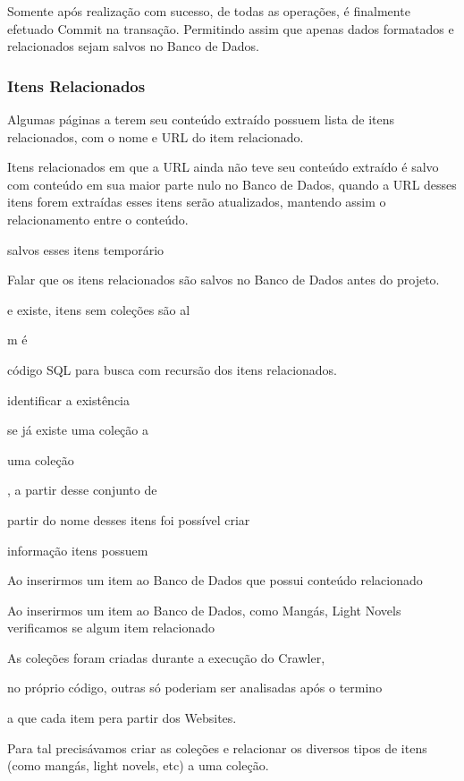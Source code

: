 \documentclass[12pt]{article}
\begin{document}
Somente após realização com sucesso, de todas as operações, é finalmente efetuado Commit na transação. Permitindo assim que apenas dados formatados e relacionados sejam salvos no Banco de Dados.


\subsubsection{Itens Relacionados}



Algumas páginas a terem seu conteúdo extraído possuem lista de itens relacionados, com o nome e URL do item relacionado.

Itens relacionados em que a URL ainda não teve seu conteúdo extraído é salvo com conteúdo em sua maior parte nulo no Banco de Dados, quando a URL desses itens forem extraídas esses itens serão atualizados, mantendo assim o relacionamento entre o conteúdo.


salvos esses itens temporário


Falar que os itens relacionados são salvos no Banco de Dados antes do projeto.
 


e existe, itens sem coleções são al

m é 

código SQL para busca com recursão dos itens relacionados.


identificar a existência 

se já existe uma coleção a 

uma coleção 


, a partir desse conjunto de 

 partir do nome desses itens foi possível criar 

informação  itens possuem 

Ao inserirmos um item ao Banco de Dados que possui conteúdo relacionado 

Ao inserirmos um item ao Banco de Dados, como Mangás, Light Novels verificamos se algum item relacionado

As coleções foram criadas durante a execução do Crawler, 

 no próprio código, outras só poderiam ser analisadas após o termino 

 a que cada item pera partir dos Websites.


Para tal precisávamos criar as coleções e relacionar os diversos tipos de itens (como mangás, light novels, etc) a uma coleção.
\end{document}
